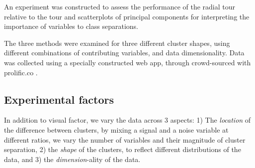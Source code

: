 \documentclass{monashthesis}
\begin{document}
An experiment was constructed to assess the performance of the radial tour relative to the tour and scatterplots of principal components for interpreting the importance of variables to class separations.

The three methods were examined for three different cluster shapes, using different combinations of contributing variables, and data dimensionality. Data was collected using a specially constructed web app, through crowd-sourced with prolific.co \autocite{palan_prolific_2018}.

\hypertarget{sec:blocks}{%
\subsection{Experimental factors}\label{sec:blocks}}

In addition to visual factor, we vary the data across 3 aspects: 1) The \emph{location} of the difference between clusters, by mixing a signal and a noise variable at different ratios, we vary the number of variables and their magnitude of cluster separation, 2) the \emph{shape} of the clusters, to reflect different distributions of the data, and 3) the \emph{dimension}-ality of the data.
\end{document}
